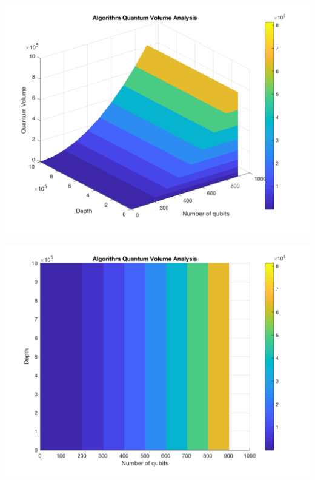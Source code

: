 \documentclass[11pt]{article}
\begin{document}
\begin{minipage}{.45\textwidth}

\centering

\begin{center}
\includegraphics[width=.9\linewidth]{V_q_analysis_asym2.png}
\end{center}

\label{fig:algorithmQV2asym}

\end{minipage}%
\hspace{1cm}
\begin{minipage}{.45\textwidth}

\begin{center}
\includegraphics[width=.9\linewidth]{V_q_analysis_asym1.png}
\end{center}

\label{fig:algorithmQV1asym}

\end{minipage}%
\end{document}
